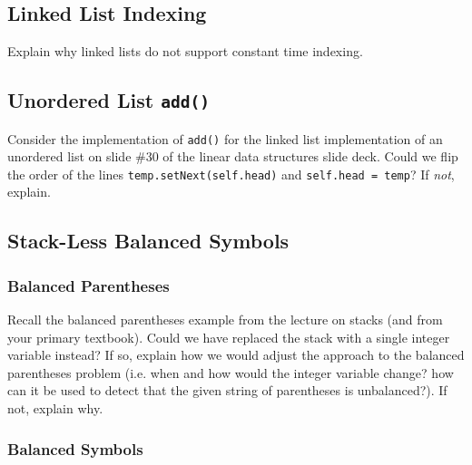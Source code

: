 \documentclass{article}
\begin{document}
\subsection{Linked List Indexing}

Explain why linked lists do not support constant time indexing.

\begin{mdframed}
\vspace{3em}
\end{mdframed}

\subsection{Unordered List \lstinline{add()}}

Consider the implementation of \lstinline{add()} for the linked list implementation of an unordered list on slide \#30 of the linear data structures slide deck. Could we flip the order of the lines \lstinline{temp.setNext(self.head)} and \lstinline{self.head = temp}? If \textit{not}, explain.

\begin{mdframed}
\vspace{3em}
\end{mdframed}

\subsection{Stack-Less Balanced Symbols}

\subsubsection{Balanced Parentheses}

Recall the balanced parentheses example from the lecture on stacks (and from your primary textbook). Could we have replaced the stack with a single integer variable instead? If so, explain how we would adjust the approach to the balanced parentheses problem (i.e. when and how would the integer variable change? how can it be used to detect that the given string of parentheses is unbalanced?). If not, explain why.

\begin{mdframed}
\vspace{3em}
\end{mdframed}

\subsubsection{Balanced Symbols}
\end{document}
